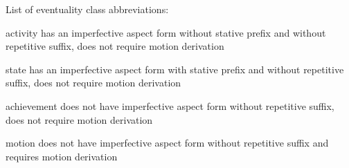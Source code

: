 \vspace{\baselineskip}
\noindent
List of eventuality class abbreviations:
\begin{description}[font={\normalfont}, style=sameline, labelindent=\parindent, labelwidth=3em, leftmargin=!]
\item[act]	activity\newline
		has an imperfective aspect form without stative prefix
		and without repetitive suffix, does not require motion derivation
\item[state]	state\newline
		has an imperfective aspect form with stative prefix
		and without repetitive suffix, does not require motion derivation
\item[ach]	achievement\newline
		does not have imperfective aspect form without repetitive suffix,
		does not require motion derivation
\item[mot]	motion\newline
		does not have imperfective aspect form without repetitive suffix
		and requires motion derivation
\end{description}
